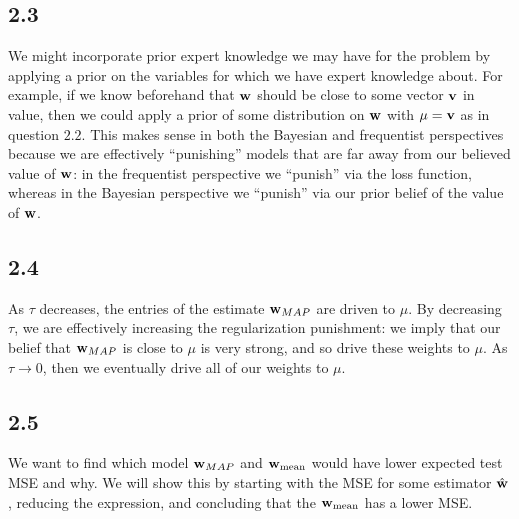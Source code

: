 \documentclass[submit]{harvardml}
\newcommand{\wmean}{\vb{w}_{\text{mean}}}
\newcommand{\what}{\hat{\vb{w}}}
\begin{document}
\subsection*{2.3}
We might incorporate prior expert knowledge we may have for the problem by applying a prior on the variables for which we have expert knowledge about. For example, if we know beforehand that $\vb{w}$ should be close to some vector $\vb{v}$ in value, then we could apply a prior of some distribution on $\vb{w}$ with $\mu = \vb{v}$ as in question $2.2$. This makes sense in both the Bayesian and frequentist perspectives because we are effectively ``punishing'' models that are far away from our believed value of $\vb{w}$: in the frequentist perspective we ``punish'' via the loss function, whereas in the Bayesian perspective we ``punish'' via our prior belief of the value of $\vb{w}$.

\subsection*{2.4}
As $\tau$ decreases, the entries of the estimate $\vb{w}_{MAP}$ are driven to $\mu$. By decreasing $\tau$, we are effectively increasing the regularization punishment: we imply that our belief that $\vb{w}_{MAP}$ is close to $\mu$ is very strong, and so drive these weights to $\mu$. As $\tau \rightarrow 0$, then we eventually drive all of our weights to $\mu$.

\subsection*{2.5}
We want to find which model $\vb{w}_{MAP}$ and $\wmean$ would have lower expected test MSE and why. We will show this by starting with the MSE for some estimator $\what$, reducing the expression, and concluding that the $\vb{w}_{\text{mean}}$ has a lower MSE.
\end{document}
